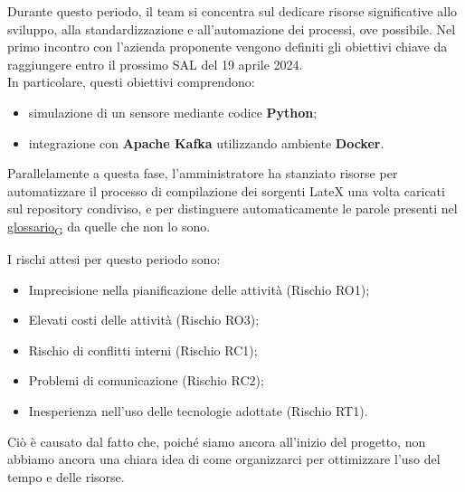 Durante questo periodo, il team si concentra sul dedicare risorse significative allo sviluppo, alla standardizzazione e all'automazione dei processi, ove possibile. Nel primo incontro con l'azienda proponente vengono definiti gli obiettivi chiave da raggiungere entro il prossimo SAL del 19 aprile 2024. \\
In particolare, questi obiettivi comprendono:
\begin{itemize}
    \item simulazione di un sensore mediante codice \textbf{Python};
    \item integrazione con \textbf{Apache Kafka} utilizzando ambiente \textbf{Docker}.
\end{itemize}
Parallelamente a questa fase, l'amministratore ha stanziato risorse per automatizzare il processo di compilazione dei sorgenti LateX una volta caricati sul repository condiviso, e per distinguere automaticamente le parole presenti nel \href{https://7last.github.io/docs/rtb/documentazione-interna/glossario#glossario}{glossario\textsubscript{G}} da quelle che non lo sono.

I rischi attesi per questo periodo sono:
\begin{itemize}
    \item Imprecisione nella pianificazione delle attività (Rischio RO1);
    \item Elevati costi delle attività (Rischio RO3);
    \item Rischio di conflitti interni (Rischio RC1);
    \item Problemi di comunicazione (Rischio RC2);
    \item Inesperienza nell'uso delle tecnologie adottate (Rischio RT1).
\end{itemize}
Ciò è causato dal fatto che, poiché siamo ancora all'inizio del progetto, non abbiamo ancora una chiara idea di come organizzarci per ottimizzare l'uso del tempo e delle risorse.

